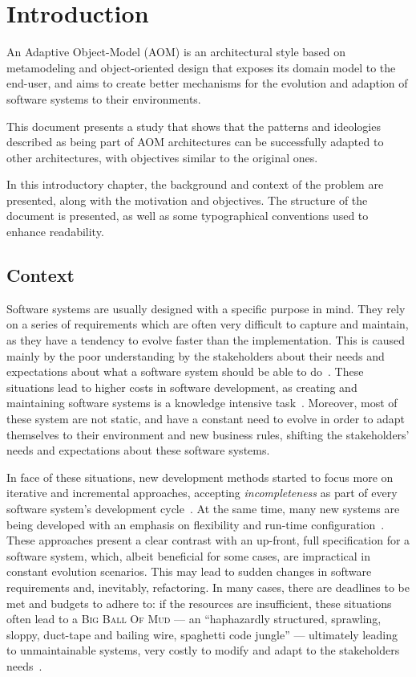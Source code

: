 \chapter{Introduction}\label{chap:intro}

An Adaptive Object-Model (AOM) is an architectural style based on metamodeling and object-oriented design that exposes its domain model to the end-user, and aims to create better mechanisms for the evolution and adaption of software systems to their environments.

This document presents a study that shows that the patterns and ideologies described as being part of AOM architectures can be successfully adapted to other architectures, with objectives similar to the original ones.

In this introductory chapter, the background and context of the problem are presented, along with the motivation and objectives. The structure of the document is presented, as well as some typographical conventions used to enhance readability.

\section{Context}\label{sec:context}

Software systems are usually designed with a specific purpose in mind. They rely on a series of requirements which are often very difficult to capture and maintain, as they have a tendency to evolve faster than the implementation. This is caused mainly by the poor understanding by the stakeholders about their needs and expectations about what a software system should be able to do~\cite{PT07}. These situations lead to higher costs in software development, as creating and maintaining software systems is a knowledge intensive task~\cite{AdOdSBD07}. Moreover, most of these system are not static, and have a constant need to evolve in order to adapt themselves to their environment and new business rules, shifting the stakeholders' needs and expectations about these software systems.

In face of these situations, new development methods started to focus more on iterative and incremental approaches, accepting \emph{incompleteness} as part of every software system's development cycle~\cite{WC03}. At the same time, many new systems are being developed with an emphasis on flexibility and run-time configuration~\cite{YJ02}. These approaches present a clear contrast with an up-front, full specification for a software system, which, albeit beneficial for some cases, are impractical in constant evolution scenarios. This may lead to sudden changes in software requirements and, inevitably, refactoring. In many cases, there are deadlines to be met and budgets to adhere to: if the resources are insufficient, these situations often lead to a \textsc{Big Ball Of Mud} --- an ``haphazardly structured, sprawling, sloppy, duct-tape and bailing wire, spaghetti code jungle''\cite{big_ball_of_mud} --- ultimately leading to unmaintainable systems, very costly to modify and adapt to the stakeholders needs~\cite{FY97}.

